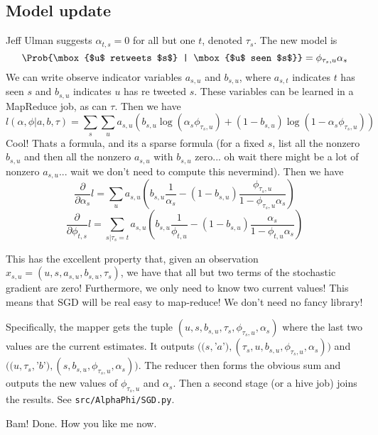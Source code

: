 \subsection*{Model update}

Jeff Ulman suggests $\alpha_{t,s}=0$ for all but one $t$, denoted $\tau_s$.
The new model is
\[\Prob{\mbox{$u$ retweets $s$} | \mbox{$u$ seen $s$}} = \phi_{\tau_s,u}\alpha_{s}\]
We can write observe indicator variables $a_{s,u}$ and $b_{s,u}$, where $a_{s,t}$ indicates $t$ has seen $s$ and $b_{s,u}$ indicates $u$ has re tweeted $s$.
These variables can be learned in a MapReduce job, as can $\tau$.  
Then we have
\[l(\alpha,\phi | a,b,\tau) = \sum_s \sum_u a_{s,u}\left(b_{s,u}\log(\alpha_{s}\phi_{\tau_s,u}) + (1-b_{s,u})\log(1-\alpha_{s}\phi_{\tau_s,u})\right)\]
Cool!  Thats a formula, and its a sparse formula (for a fixed $s$, list all the nonzero $b_{s,u}$ and then all the nonzero $a_{s,u}$ with $b_{s,u}$ zero... oh wait there might be a lot of nonzero $a_{s,u}$... wait we don't need to compute this nevermind).  
Then we have
\[\frac{\partial}{\partial \alpha_s}l = \sum_u a_{s,u}\left(b_{s,u}\frac{1}{\alpha_s} - (1-b_{s,u})\frac{\phi_{\tau_s,u}}{1-\phi_{\tau_s,u}\alpha_s}\right)\]
\[\frac{\partial}{\partial \phi_{t,s}}l = \sum_{s|\tau_s=t} a_{s,u}\left(b_{s,u}\frac{1}{\phi_{t,u}} - (1-b_{s,u})\frac{\alpha_s}{1-\phi_{t,u}\alpha_s}\right)\]

This has the excellent property that, given an observation $x_{s,u} = (u,s,a_{s,u},b_{s,u},\tau_s)$, we have that all but two terms of the stochastic gradient are zero!  Furthermore, we only need to know two current values!
This means that SGD will be real easy to map-reduce!  We don't need no fancy library! 

Specifically, the mapper gets the tuple $(u,s,b_{s,u},\tau_s,\phi_{\tau_s,u},\alpha_s)$ where the last two values are the current estimates.
It outputs $((s,$'$a$'$),(\tau_s,u,b_{s,u},\phi_{\tau_s,u},\alpha_s))$ and $((u,\tau_s,$'$b$'$),(s,b_{s,u},\phi_{\tau_s,u},\alpha_s))$.
The reducer then forms the obvious sum and outputs the new values of $\phi_{\tau_s,u}$ and $\alpha_s$.
Then a second stage (or a hive job) joins the results.  See \texttt{src/AlphaPhi/SGD.py}.  

Bam!  Done.  How you like me now.  
